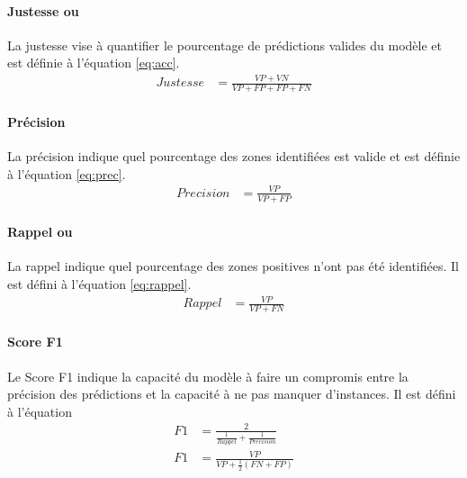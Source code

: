       \paragraph{Justesse ou  \fg{}} 
      La justesse vise à quantifier le pourcentage de prédictions valides du modèle et est définie à l'équation \ref{eq:acc}\parencite{wallach_deep_2024}.
      \begin{align}
        Justesse & = \frac{VP+VN}{VP + FP + FP + FN}\label{eq:acc}
      \end{align}
      \paragraph{Précision}
      La précision indique quel pourcentage des zones identifiées est valide et est définie à l'équation \ref{eq:prec}\parencite{wallach_deep_2024}.
      \begin{align}
        Precision & = \frac{VP}{VP + FP}\label{eq:prec}
      \end{align}
      \paragraph{Rappel ou  \fg{}}
      La rappel indique quel pourcentage des zones positives n'ont pas été identifiées. Il est défini à l'équation \ref{eq:rappel}\parencite{wallach_deep_2024}.
      \begin{align}
        Rappel & = \frac{VP}{VP + FN}\label{eq:rappel}
      \end{align}
      \paragraph{Score F1} Le Score F1 indique la capacité du modèle à faire un compromis entre la précision des prédictions et la capacité à ne pas manquer d'instances. Il est défini à l'équation 
      \begin{align}
        F1 & = \frac{2}{\frac{1}{Rappel} + \frac{1}{Precision}}\label{eq:F1_1}\\
        F1 & = \frac{VP}{VP + \frac{1}{2} (FN + FP)}
      \end{align}

